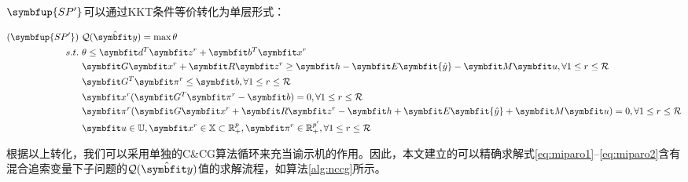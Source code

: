 $\symbfup{SP^\prime}$可以通过KKT条件等价转化为单层形式：

\begin{align}
  (\symbfup{SP^\prime})\ & \mathcal{Q}(\hat{\symbfit y})=\max \theta \\
  s.t.\ & \theta\le \symbfit d^T\symbfit z^r + \symbfit b^T\symbfit x^r \\
  & \symbfit G \symbfit x^r +\symbfit R\symbfit z^r\ge \symbfit h - \symbfit E \symbfit{\hat{y}}  - \symbfit M \symbfit u, \forall 1\le r\le \mathcal R \\
  & \symbfit G^T\symbfit \pi^r \le \symbfit b, \forall 1\le r\le \mathcal R \\
  & \symbfit x^r(\symbfit G^T\symbfit \pi^r -\symbfit b) =0, \forall 1\le r\le \mathcal R\\
  & \symbfit \pi^r(\symbfit G \symbfit x^r +\symbfit R\symbfit z^r- \symbfit h +\symbfit E \symbfit{\hat{y}}+ \symbfit M \symbfit u) =0, \forall 1\le r\le \mathcal R \\ 
  &\symbfit u\in\mathbb U, \symbfit x^r\in\mathbb X\subset \mathbb R_+^p, \symbfit \pi^r\in\mathbb R_+^{p^\prime}, \forall 1\le r\le \mathcal R 
\end{align}

根据以上转化，我们可以采用单独的C\&CG算法循环来充当谕示机的作用。因此，本文建立的可以精确求解式\eqref{eq:miparo1}--\eqref{eq:miparo2}含有混合追索变量下子问题的$\mathcal Q(\hat{\symbfit y})$值的求解流程，如算法\ref{alg:nccg}所示。

